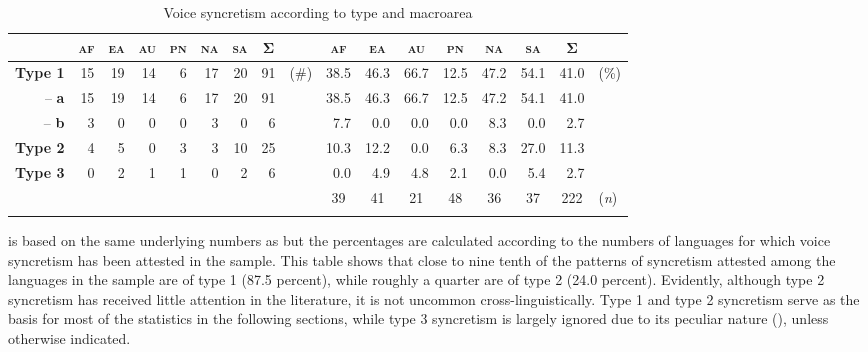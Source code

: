 \begin{table}
	\setlength{\tabcolsep}{2.8pt}
	\begin{tabularx}{\textwidth}{lrrrrrrrlrrrrrrrl}
		\lsptoprule
		& \multicolumn{1}{c}{\textbf{\textsc{af}}} & \multicolumn{1}{c}{\textbf{\textsc{ea}}} & \multicolumn{1}{c}{\textbf{\textsc{au}}} & \multicolumn{1}{c}{\textbf{\textsc{pn}}} & \multicolumn{1}{c}{\textbf{\textsc{na}}} & \multicolumn{1}{c}{\textbf{\textsc{sa}}} & \multicolumn{1}{c}{\textbf{Σ}} & & \multicolumn{1}{c}{\textbf{\textsc{af}}} & \multicolumn{1}{c}{\textbf{\textsc{ea}}} & \multicolumn{1}{c}{\textbf{\textsc{au}}} & \multicolumn{1}{c}{\textbf{\textsc{pn}}} & \multicolumn{1}{c}{\textbf{\textsc{na}}} & \multicolumn{1}{c}{\textbf{\textsc{sa}}} & \multicolumn{1}{c}{\textbf{Σ}} & \\
		\midrule
		\textbf{Type 1} & 15 & 19 & 14 & 6 & 17 & 20 & 91 & (\#) & 38.5 & 46.3 & 66.7 & 12.5 & 47.2 & 54.1 & 41.0 & (\%) \\
		\multicolumn{1}{r}{-- \textbf{a}} & 15 & 19 & 14 & 6 & 17 & 20 & 91 & & 38.5 & 46.3 & 66.7 & 12.5 & 47.2 & 54.1 & 41.0 & \\
		\multicolumn{1}{r}{-- \textbf{b}} & 3 & 0 & 0 & 0 & 3 & 0 & 6 & & 7.7 & 0.0 & 0.0 & 0.0 & 8.3 & 0.0 & 2.7 & \\
		\textbf{Type 2} & 4 & 5 & 0 & 3 & 3 & 10 & 25 & & 10.3 & 12.2 & 0.0 & 6.3 & 8.3 & 27.0 & 11.3 & \\
		\textbf{Type 3} & 0 & 2 & 1 & 1 & 0 & 2 & 6 & & 0.0 & 4.9 & 4.8 & 2.1 & 0.0 & 5.4 & 2.7 & \\
		\midrule
		& & & & & & & & & \multicolumn{1}{c}{39} & \multicolumn{1}{c}{41} & \multicolumn{1}{c}{21} & \multicolumn{1}{c}{48} & \multicolumn{1}{c}{36} & \multicolumn{1}{c}{37} & \multicolumn{1}{c}{222} & (\textit{n}) \\
		\lspbottomrule
	\end{tabularx}
	\caption{Voice syncretism according to type and macroarea}
	\label{tab:ch6:voice-syncretism-type-1}
\end{table} 

\newpage

 is based on the same underlying numbers as  but the percentages are calculated according to the numbers of languages for which voice syncretism has been attested in the sample. This table shows that close to nine tenth of the patterns of syncretism attested among the languages in the sample are of type 1 (87.5 percent), while roughly a quarter are of type 2 (24.0 percent). Evidently, although type 2 syncretism has received little attention in the literature, it is not uncommon cross-linguistically.  Type 1 and type 2 syncretism serve as the basis for most of the statistics in the following sections, while type 3 syncretism is largely ignored due to its peculiar nature (), unless otherwise indicated. 

